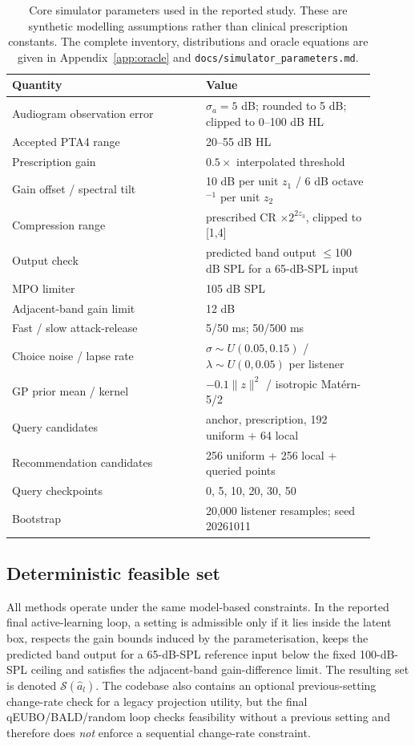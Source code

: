 \documentclass[preprint,12pt]{elsarticle}
\begin{document}
\begin{table}[!htbp]
\centering
\caption{Core simulator parameters used in the reported study. These are synthetic modelling assumptions rather than clinical prescription constants. The complete inventory, distributions and oracle equations are given in Appendix~\ref{app:oracle} and \texttt{docs/simulator\_parameters.md}.}
\label{tab:simparams}
\small
\begin{tabular}{p{0.48\linewidth}p{0.42\linewidth}}
\toprule
Quantity & Value \\
\midrule
Audiogram observation error & $\sigma_a=5$ dB; rounded to 5 dB; clipped to 0--100 dB HL \\
Accepted PTA4 range & 20--55 dB HL \\
Prescription gain & $0.5\times$ interpolated threshold \\
Gain offset / spectral tilt & 10 dB per unit $z_1$ / 6 dB octave$^{-1}$ per unit $z_2$ \\
Compression range & prescribed CR $\times 2^{2z_3}$, clipped to [1,4] \\
Output check & predicted band output $\le$100 dB SPL for a 65-dB-SPL input \\
MPO limiter & 105 dB SPL \\
Adjacent-band gain limit & 12 dB \\
Fast / slow attack-release & 5/50 ms; 50/500 ms \\
Choice noise / lapse rate & $\sigma\sim U(0.05,0.15)$ / $\lambda\sim U(0,0.05)$ per listener \\
GP prior mean / kernel & $-0.1\|z\|^2$ / isotropic Mat\'ern-5/2 \\
Query candidates & anchor, prescription, 192 uniform + 64 local \\
Recommendation candidates & 256 uniform + 256 local + queried points \\
Query checkpoints & 0, 5, 10, 20, 30, 50 \\
Bootstrap & 20,000 listener resamples; seed 20261011 \\
\bottomrule
\end{tabular}
\end{table}

\subsection{Deterministic feasible set}

All methods operate under the same model-based constraints. In the reported final active-learning loop, a setting is admissible only if it lies inside the latent box, respects the gain bounds induced by the parameterisation, keeps the predicted band output for a 65-dB-SPL reference input below the fixed 100-dB-SPL ceiling and satisfies the adjacent-band gain-difference limit. The resulting set is denoted $\mathcal S(\hat a_l)$. The codebase also contains an optional previous-setting change-rate check for a legacy projection utility, but the final qEUBO/BALD/random loop checks feasibility without a previous setting and therefore does \emph{not} enforce a sequential change-rate constraint.
\end{document}
